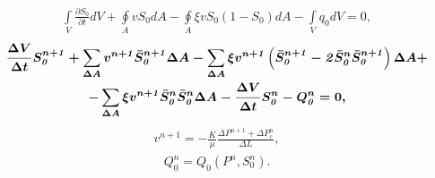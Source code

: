 \documentclass[a4paper,12pt]{extreport}
\begin{document}
  \begin{eqnarray}
    \int \limits_{V} \frac{\partial S_{\mathit 0}}{\partial t} d V + \oint \limits_{A} v S_{\mathit 0} d A -
    \oint \limits_{A} \xi v S_{\mathit 0} \left(\mathit{1} - S_{\mathit 0}\right) d A -  \int \limits_{V} q_{\mathit 0} d V = 0,
  \end{eqnarray}
  \begin{eqnarray}
  \boldmath
    \begin{gathered}
      \frac{\Delta V}{\Delta t} S_{\mathit 0}^{n+\mathit{1}} + \sum_{\Delta A} v^{n + \mathit{1}}\bar{S}_{\mathit 0}^{n+\mathit{1}} \Delta A -
      \sum_{\Delta A} \xi v^{n + \mathit{1}}  \left(\bar{S}_{\mathit 0}^{n+\mathit{1}} - \mathit{2}  \bar{S}_{\mathit 0}^{n} \bar{S}_{\mathit 0}^{n + \mathit{1}}\right)   \Delta A +  \\    
      -\sum_{\Delta A} \xi v^{n + \mathit{1}}\bar{S}_{\mathit 0}^{n}\bar{S}_{\mathit 0}^{n} \Delta A -
      \frac{\Delta V}{\Delta t} S_{\mathit 0}^{n} - Q_{\mathit 0}^n = 0,
     \end{gathered}
  \end{eqnarray}
  \begin{eqnarray}
     v^{n + \mathit{1}} = - \frac{K}{\mu} \frac{\Delta P^{n + \mathit{1}} + \Delta P_c^{n} }{\Delta L},
  \end{eqnarray}
  \begin{eqnarray}
      Q_{\mathit 0}^n = Q_{\mathit 0}\left(P^n, S_{\mathit 0}^n\right).
  \end{eqnarray}
\end{document}
